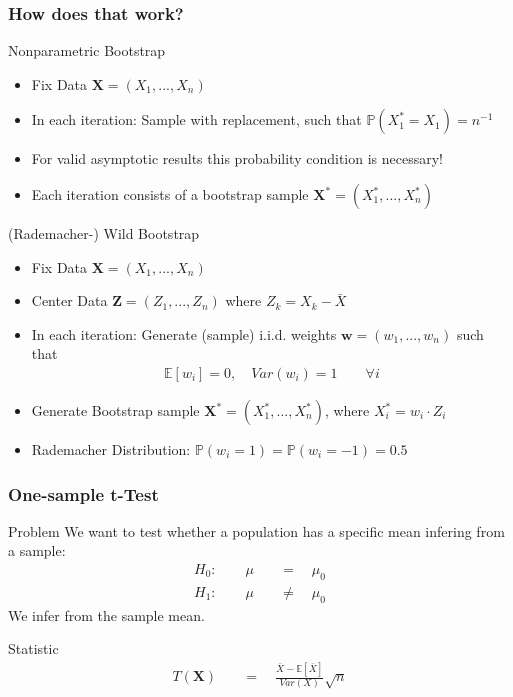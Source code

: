 \documentclass[9pt, dvipsnames]{beamer} %
\begin{document}
	\begin{frame}
		\frametitle{\textbf{How does that work?}}
    		\begin{block}{Nonparametric Bootstrap}
    			\begin{itemize}
    				\item Fix Data $\mathbf{X} = (X_1, ..., X_n)$
    				\item In each iteration: Sample with replacement, such that $\mathbb{P}(X_1^{*} = X_1) = n^{-1}$
    				\item For valid asymptotic results this probability condition is necessary!
    				\item Each iteration consists of a bootstrap sample $\mathbf{X^{*}} = (X_1^{*}, ..., X_n^{*})$
    			\end{itemize}
    		\end{block}
    		\begin{block}{(Rademacher-) Wild Bootstrap}
    			\begin{itemize}
    				\item Fix Data $\mathbf{X} = (X_1, ..., X_n)$
    				\item Center Data $\mathbf{Z} = (Z_1, ..., Z_n)$ where $Z_k = X_k - \bar{X}$
    				\item In each iteration: Generate (sample) i.i.d. weights $\mathbf{w} = (w_1, ..., w_n)$ such that
    				\begin{align*}
    					\mathbb{E}[w_i] = 0, \quad Var(w_i) = 1 \qquad \forall i
    				\end{align*}
    				\item Generate Bootstrap sample $\mathbf{X^{*}} = (X_1^{*}, ..., X_n^{*})$, where $X_i^{*} = w_i \cdot Z_i$
    				\item Rademacher Distribution: $\mathbb{P}(w_i = 1) = \mathbb{P}(w_i = -1) = 0.5$
    			\end{itemize}
    		\end{block}
    \end{frame}
    \begin{frame}
    \frametitle{\textbf{One-sample t-Test}}
		\begin{block}{Problem}
			We want to test whether a population has a specific mean infering from a sample:
			\begin{align*}
				H_0: \qquad \mu \quad &= \quad \mu_0 \\
				H_1: \qquad \mu \quad &\neq \quad \mu_0
			\end{align*}			
			We infer from the sample mean.
		\end{block}		    	
    	\begin{alertblock}{Statistic}
    		\begin{align*}
    			T(\mathbf{X}) \quad &= \quad \frac{\bar{X} - \mathbb{E}[\bar{X}]}{Var(X)}\sqrt{n}
    		\end{align*}
    	\end{alertblock}
    \end{frame}
    
\end{document}
